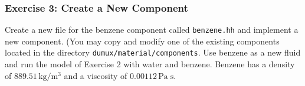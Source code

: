 \subsubsection{Exercise 3: Create a New Component}

Create a new file for the benzene component called \texttt{benzene.hh}
and implement a new component. (You may copy and modify one of the
existing components located in the directory
\texttt{dumux/material/components}. Use benzene as a new fluid and
run the model of Exercise 2 with water and benzene. Benzene has a
density of $889.51 \, \text{kg} / \text{m}^3$ and a viscosity of
$0.00112 \, \text{Pa} \; \text{s}$.

\clearpage \newpage

